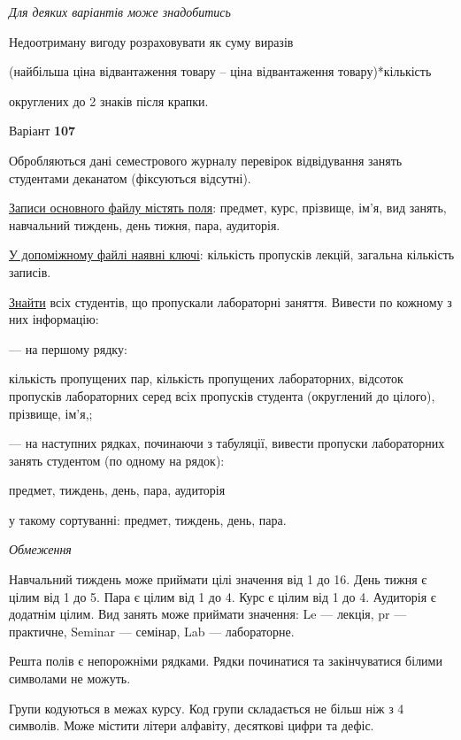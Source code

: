 \documentclass[11pt, ukrainian]{article}
\begin{document}
\bigskip\textit{Для деяких варіантів може знадобитись}

Недоотриману вигоду розраховувати як суму виразів
{\center (найбільша ціна відвантаження товару – ціна відвантаження товару)*кількість\par}

\bigskip
{\noindent} округлених до 2 знаків після крапки.




\par
\newpage
{\center Варіант  \No \textbf { 107 }\par}
\bigskip
Обробляються дані семестрового журналу перевірок відвідування занять студентами деканатом (фіксуються відсутні). 

\underline{Записи основного файлу містять поля}: предмет, курс, прізвище, ім’я, вид занять, навчальний тиждень, день тижня, пара, аудиторія.

\underline{У допоміжному файлі наявні ключі}: кількість пропусків лекцій, загальна кількість записів.

\underline{Знайти} всіх студентів, що пропускали лабораторні заняття. Вивести по кожному з них інформацію:\par
{\noindent}--- на першому рядку:\par
кількість пропущених пар, кількість пропущених лабораторних, відсоток пропусків лабораторних серед всіх пропусків студента (округлений до цілого), прізвище, ім’я,;

{\noindent}--- на наступних рядках, починаючи з табуляції, вивести пропуски лабораторних занять студентом (по одному на рядок):\par
предмет, тиждень, день, пара, аудиторія

{\noindent}у такому сортуванні: предмет, тиждень, день, пара.


\bigskip\textit{Обмеження}

Навчальний тиждень може приймати цілі значення від 1 до 16.
День тижня є цілим від 1 до 5. Пара є цілим від 1 до 4.
Курс є цілим від 1 до 4. Аудиторія є додатнім цілим.
Вид занять може приймати значення:
Le --- лекція, pr --- практичне, Seminar --- семінар, Lab --- лабораторне.

Решта полів є непорожніми рядками.
Рядки починатися та закінчуватися білими символами не можуть.

Групи кодуються в межах курсу.
Код групи складається не більш ніж з 4 символів.
Може містити літери алфавіту, десяткові цифри та дефіс.
\end{document}
